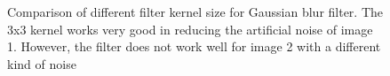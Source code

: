 \documentclass[11pt,a4paper]{article}
\begin{document}
\begin{figure}
\quad
{}
\quad
{}
\quad

\caption{Comparison of different filter kernel size for Gaussian blur filter. The 3x3 kernel works very good in reducing the artificial noise of image 1. However, the filter does not work well for image 2 with a different kind of noise}%
\label{fig:gblur}%
\end{figure}
\end{document}
